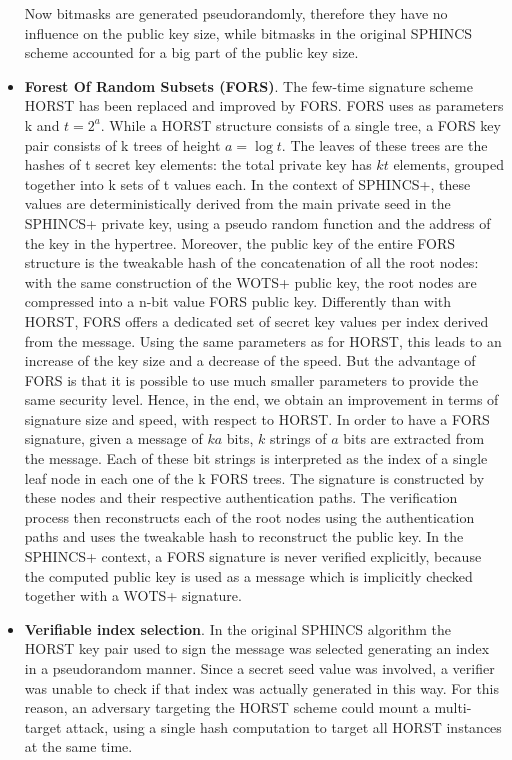 \documentclass[a4paper,12pt]{article}
\begin{document}
\begin{itemize}
	Now bitmasks are generated pseudorandomly, therefore they have no influence on the public key size, while bitmasks in the original SPHINCS scheme accounted for a big part of the public key size.
	\item \textbf{Forest Of Random Subsets (FORS)}. The few-time signature scheme HORST has been replaced and improved by FORS. FORS uses as parameters k and $t=2^{a}$.
	While a HORST structure consists of a single tree, a FORS key pair consists of k trees of height $a = \log t$.
	The leaves of these trees are the hashes of t secret key elements: the total private key has $kt$ elements, grouped together into k sets of t values each. In the context of SPHINCS+, these values are deterministically derived from the main private seed in the SPHINCS+ private key, using a pseudo random function and the address of the key in the hypertree.
	Moreover, the public key of the entire FORS structure is the tweakable hash of the concatenation of all the root nodes: with the same construction of the WOTS+ public key, the root nodes are compressed into a n-bit value FORS public key.
	Differently than with HORST, FORS offers a dedicated set of secret key values per index derived from the message. Using the same parameters as for HORST, this leads to an increase of the key size and a decrease of the speed. But the advantage of FORS is that it is possible to use much smaller parameters to provide the same security level. Hence, in the end, we obtain an improvement in terms of signature size and speed, with respect to HORST.
	In order to have a FORS signature, given a message of $ka$ bits, $k$ strings of $a$ bits are extracted from the message. Each of these bit strings is interpreted as the index of a single leaf node in each one of the k FORS trees. The signature is constructed by these nodes and their respective authentication paths.
	The verification process then reconstructs each of the root nodes using the authentication paths and uses the tweakable hash to reconstruct the public key.
	In the SPHINCS+ context, a FORS signature is never verified explicitly, because the computed public key is used as a message which is implicitly checked together with a WOTS+ signature.
	\item \textbf{Verifiable index selection}. In the original SPHINCS algorithm the HORST key pair used to sign the message was selected generating an index in a pseudorandom manner. Since a secret seed value was involved, a verifier was unable to check if that index was actually generated in this way. For this reason, an adversary targeting the HORST scheme could mount a multi-target attack, using a single hash computation to target all HORST instances at the same time.

\end{itemize}
\end{document}
